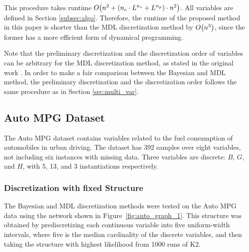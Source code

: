 This procedure takes runtime $\bigo \paren{ n^3 + \paren{ n_c \cdot {L}^{n_s}  + {L}^{n_p}} \cdot n^2 }$. 
All variables are defined in Section \ref{subsec:algo}.
Therefore, the runtime of the proposed method in this paper is shorter than the MDL discretization method by $\bigo \paren{n^3}$, since the former has a more efficient form of dynamical programming.

Note that the preliminary discretization and the discretization order of variables can be arbitrary for the MDL discretization method, as stated in the original work \citep{Friedman_1996}. In order to make a fair comparison between the Bayesian and MDL method, the preliminary discretization and the discretization order follows the same procedure as in Section \ref{sec:multi_var}.

\subsection{Auto MPG Dataset}
\label{subsec:auto}

The Auto MPG dataset contains variables related to the fuel consumption of automobiles in urban driving.
The dataset has \num{392} samples over eight variables, not including six instances with missing data.
Three variables are discrete: $B$, $G$, and $H$, with \num{5}, \num{13}, and \num{3} instantiations respectively.

\subsubsection{Discretization with fixed Structure}
\label{subsubsec:auto_exp1}

The Bayesian and MDL discretization methods were tested on the Auto MPG data using the network shown in Figure~\ref{fig:auto_graph_1}.
This structure was obtained by prediscretizing each continuous variable into five uniform-width intervals, where five is the median cardinality of the discrete variables, and then taking the structure with highest likelihood from \num{1000} runs of K2.

